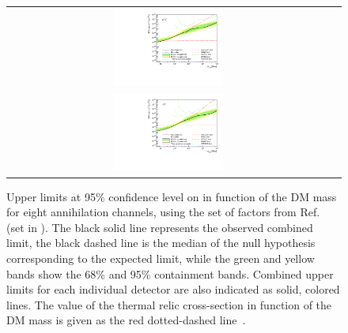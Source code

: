 \begin{figure}[ht!]
{\begin{tabular}{cc}
        \includegraphics[width=0.35\textwidth]{figures/glory_duck/limits/Glory_Duck_Annihilation_mumu_Geringer-Sameth_Combination_bands.pdf} \\
        \includegraphics[width=0.35\textwidth]{figures/glory_duck/limits/Glory_Duck_Annihilation_tautau_Geringer-Sameth_Combination_bands.pdf} &
        \end{tabular}
        }
        \caption{Upper limits at 95\% confidence level on \sv in function of the DM mass for eight annihilation channels, using the set of \J factors from Ref.~\cite{Geringer-Sameth:2014yza} (\GS set in ). The black solid line represents the observed combined limit, the black dashed line is the median of the null hypothesis corresponding to the expected limit, while the green and yellow bands show the 68\% and 95\% containment bands. Combined upper limits for each individual detector are also indicated as solid, colored lines.
        The value of the thermal relic cross-section in function of the DM mass is given as the red dotted-dashed line~\cite{Bertone_2005}.}
    \label{fig:limits-geringer-sameth}
    \end{figure}


